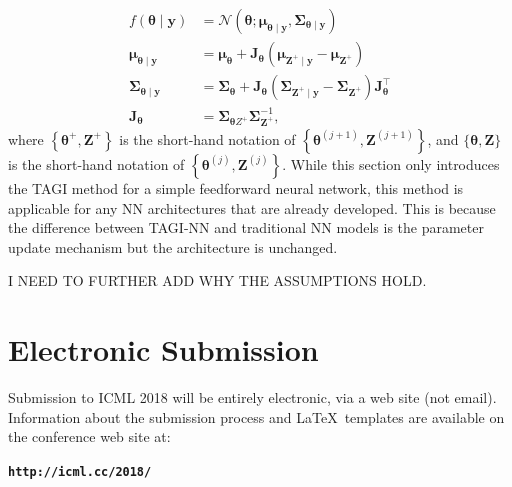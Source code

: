 \documentclass{article}
\begin{document}
\begin{equation*}
\begin{aligned}
f(\boldsymbol{\theta} \mid \boldsymbol{y}) &=\mathcal{N}\left(\boldsymbol{\theta} ; \boldsymbol{\mu}_{\boldsymbol{\theta} \mid \boldsymbol{y}}, \boldsymbol{\Sigma}_{\boldsymbol{\theta} \mid \boldsymbol{y}}\right) \\
\boldsymbol{\mu}_{\boldsymbol{\theta} \mid \boldsymbol{y}} &=\boldsymbol{\mu}_{\boldsymbol{\theta}}+\mathbf{J}_{\boldsymbol{\theta}}\left(\boldsymbol{\mu}_{\boldsymbol{Z}^{+} \mid \boldsymbol{y}}-\boldsymbol{\mu}_{\boldsymbol{Z}^{+}}\right) \\
\boldsymbol{\Sigma}_{\boldsymbol{\theta} \mid \boldsymbol{y}} &=\boldsymbol{\Sigma}_{\boldsymbol{\theta}}+\mathbf{J}_{\boldsymbol{\theta}}\left(\boldsymbol{\Sigma}_{\boldsymbol{Z}^{+} \mid \boldsymbol{y}}-\boldsymbol{\Sigma}_{\boldsymbol{Z}^{+}}\right) \mathbf{J}_{\boldsymbol{\theta}}^{\top} \\
\mathbf{J}_{\boldsymbol{\theta}} &=\boldsymbol{\Sigma}_{\boldsymbol{\theta} Z^{+}} \boldsymbol{\Sigma}_{\boldsymbol{Z}^{+}}^{-1},
\end{aligned}
\end{equation*}
where $\left\{\boldsymbol{\theta}^{+}, \boldsymbol{Z}^{+}\right\}$ is the short-hand notation of $\left\{\boldsymbol{\theta}^{(j+1)}, \boldsymbol{Z}^{(j+1)}\right\}$, and $\{\boldsymbol{\theta}, \boldsymbol{Z}\}$ is the short-hand notation of  $\left\{\boldsymbol{\theta}^{(j)}, \boldsymbol{Z}^{(j)}\right\}$.
While this section only introduces the TAGI method for a simple feedforward neural network, this method is applicable for any NN architectures that are already developed. This is because the difference between TAGI-NN and traditional NN models is the parameter update mechanism but the architecture is unchanged.

I NEED TO FURTHER ADD WHY THE ASSUMPTIONS HOLD.

\section{Electronic Submission}
\label{submission}

Submission to ICML 2018 will be entirely electronic, via a web site
(not email). Information about the submission process and \LaTeX\ templates
are available on the conference web site at:
\begin{center}
\textbf{\texttt{http://icml.cc/2018/}}
\end{center}
\end{document}
